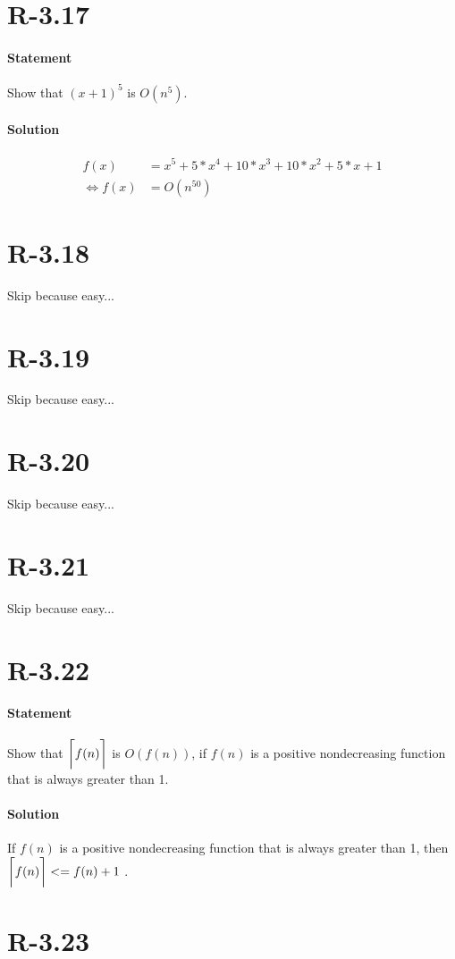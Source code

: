 \documentclass{article}
\DeclarePairedDelimiter{\ceil}{\lceil}{\rceil}
\begin{document}
\section{R-3.17}
\paragraph{Statement}
Show that $(x + 1)^5$ is $O(n^5)$.
\paragraph{Solution}
  \begin{align*}
    f(x) &= x^5 + 5*x^4 + 10*x^3 +10*x^2 + 5*x + 1\\
    \Leftrightarrow f(x) &= O(n^50)
  \end{align*}
\section{R-3.18}
  Skip because easy...
\section{R-3.19}
  Skip because easy...
\section{R-3.20}
  Skip because easy...
\section{R-3.21}
  Skip because easy...
\section{R-3.22}
  \paragraph{Statement}
  Show that $\ceil[\bigg] {f(n)}$ is $O( f (n))$, if $f (n)$ is a positive nondecreasing function that is always greater than 1.
  \paragraph{Solution}
    If $f (n)$ is a positive nondecreasing function that is always greater than 1, then $\ceil[\bigg] {f(n)} <= f(n) + 1$ .
\newpage


\section{R-3.23}
\end{document}
